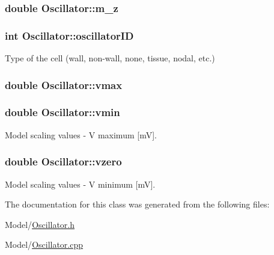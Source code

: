 \hypertarget{class_oscillator_ae00491a4783797fb6edb9c3d5317a6ad}{
\subsubsection[{m\+\_\+z}]{\setlength{\rightskip}{0pt plus 5cm}double Oscillator\+::m\+\_\+z}}\label{class_oscillator_ae00491a4783797fb6edb9c3d5317a6ad}
\hypertarget{class_oscillator_acfc962cfc0b6c92fc8ae8d7254346bef}{
\subsubsection[{oscillator\+I\+D}]{\setlength{\rightskip}{0pt plus 5cm}int Oscillator\+::oscillator\+I\+D}}\label{class_oscillator_acfc962cfc0b6c92fc8ae8d7254346bef}


Type of the cell (wall, non-\/wall, none, tissue, nodal, etc.) 

\hypertarget{class_oscillator_a43006eaf9a5a3b50a8f6a2a95ce47231}{
\subsubsection[{vmax}]{\setlength{\rightskip}{0pt plus 5cm}double Oscillator\+::vmax}}\label{class_oscillator_a43006eaf9a5a3b50a8f6a2a95ce47231}
\hypertarget{class_oscillator_a8912b5faff383dcc1a33554d2bcc5844}{
\subsubsection[{vmin}]{\setlength{\rightskip}{0pt plus 5cm}double Oscillator\+::vmin}}\label{class_oscillator_a8912b5faff383dcc1a33554d2bcc5844}


Model scaling values -\/ V maximum \mbox{[}m\+V\mbox{]}. 

\hypertarget{class_oscillator_af6886099dfca8ec732676f4f89935651}{
\subsubsection[{vzero}]{\setlength{\rightskip}{0pt plus 5cm}double Oscillator\+::vzero}}\label{class_oscillator_af6886099dfca8ec732676f4f89935651}


Model scaling values -\/ V minimum \mbox{[}m\+V\mbox{]}. 



The documentation for this class was generated from the following files\+:\begin{DoxyCompactItemize}
\item 
Model/\hyperlink{_oscillator_8h}{Oscillator.\+h}\item 
Model/\hyperlink{_oscillator_8cpp}{Oscillator.\+cpp}\end{DoxyCompactItemize}
